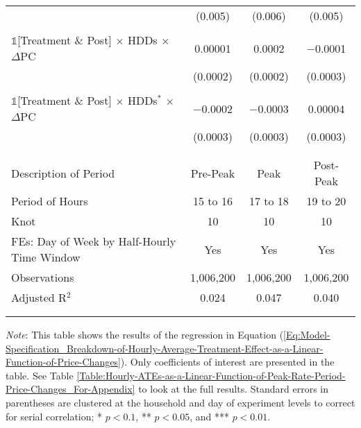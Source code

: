 {\begin{table}[t!]
\begin{adjustbox}{scale = 1.0}
\begin{threeparttable}
\begin{tabular}{@{\extracolsep{40pt}}lccc}
                    & (0.005) & (0.006) & (0.005) \\
                    & & & \\
                    $\mathbb{1}$[Treatment \& Post] $\times$ HDDs $\times$ $\Delta$PC & 0.00001 & 0.0002 & $-$0.0001 \\
                    & (0.0002) & (0.0002) & (0.0003) \\
                    & & & \\
                    $\mathbb{1}$[Treatment \& Post] $\times$ HDDs$^{*}$ $\times$ $\Delta$PC & $-$0.0002 & $-$0.0003 & 0.00004 \\
                    & (0.0003) & (0.0003) & (0.0003) \\
                    & & & \\
                    \hline
                    \\[-2.0ex]
                    Description of Period & Pre-Peak & Peak & Post-Peak \\
                    Period of Hours & 15 to 16 & 17 to 18 & 19 to 20 \\
                    Knot & 10 & 10 & 10 \\
                    FEs: Day of Week by Half-Hourly Time Window & Yes & Yes & Yes \\
                    Observations & 1,006,200 & 1,006,200 & 1,006,200 \\
                    Adjusted R$^{2}$ & 0.024 & 0.047 & 0.040 \\
                    \\[-2.0ex]
                    \hline \hline
                    \\[-4.5ex]
                \end{tabular}
                \begin{tablenotes}[flushleft]
                    \footnotesize
                    \item
                    \item \textit{Note}: This table shows the results of the regression in Equation (\ref{Eq:Model-Specification_Breakdown-of-Hourly-Average-Treatment-Effect-as-a-Linear-Function-of-Price-Changes}). Only coefficients of interest are presented in the table. See Table \ref{Table:Hourly-ATEs-as-a-Linear-Function-of-Peak-Rate-Period-Price-Changes_For-Appendix} to look at the full results. Standard errors in parentheses are clustered at the household and day of experiment levels to correct for serial correlation; * $p < 0.1$, ** $p < 0.05$, and *** $p < 0.01$.
                \end{tablenotes}
            \end{threeparttable}
        \end{adjustbox}
    \end{table}
}
